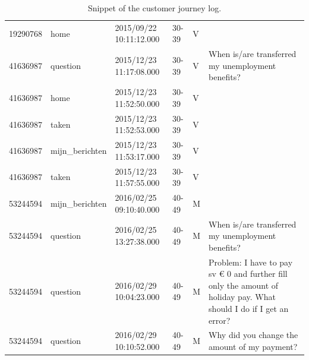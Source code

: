 \begin{appendices}
\begin{table}[!h]
\begin{tabularx}{\textwidth}{lllllp{6.9cm}}
		19290768&home&2015/09/22 10:11:12.000&30-39&V&\\
		41636987&question&2015/12/23 11:17:08.000&30-39&V&When is/are transferred my unemployment benefits?\\
		41636987&home&2015/12/23 11:52:50.000&30-39&V&\\
		41636987&taken&2015/12/23 11:52:53.000&30-39&V&\\
		41636987&mijn\_berichten&2015/12/23 11:53:17.000&30-39&V&\\
		41636987&taken&2015/12/23 11:57:55.000&30-39&V&\\
		53244594&mijn\_berichten&2016/02/25 09:10:40.000&40-49&M&\\
		53244594&question&2016/02/25 13:27:38.000&40-49&M&When is/are transferred my unemployment benefits?\\
		53244594&question&2016/02/29 10:04:23.000&40-49&M&Problem: I have to pay sv € 0 and further fill only the amount of holiday pay. What should I do if I get an error?\\
		53244594&question&2016/02/29 10:10:52.000&40-49&M&Why did you change the amount of my payment?\\
		\bottomrule
	\end{tabularx}
\caption[Snippet of the customer journey log]{Snippet of the customer journey log.}
\end{table}



\end{appendices}
